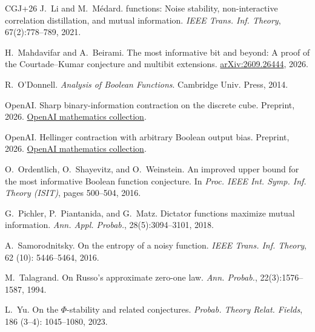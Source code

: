 \documentclass[11pt,letterpaper]{amsart}
\newcommand{\1}{\mathbf 1}
\numberwithin{equation}{section}
\begin{document}
\begin{thebibliography}{CGJ+26}
J.~Li and M.~M\'edard.
 functions: Noise stability, non-interactive correlation distillation, and mutual information.
\newblock \emph{IEEE Trans. Inf. Theory}, 67(2):778--789, 2021.

H.~Mahdavifar and A.~Beirami.
\newblock The most informative bit and beyond:
A proof of the {Courtade--Kumar} conjecture and multibit extensions.
\newblock \href{https://arxiv.org/abs/2609.26444}
{arXiv:2609.26444}, 2026.

R.~O'Donnell.
\newblock \emph{Analysis of {Boolean} Functions}.
\newblock Cambridge Univ. Press, 2014.

OpenAI.
\newblock Sharp binary-information contraction on the discrete cube.
\newblock Preprint, 2026.
\newblock \href{https://github.com/openai/math/blob/main/preprints/Sharp-binary-information-contraction-on-the-discrete-cube-September-24-2026/main.pdf}
{OpenAI mathematics collection}.

OpenAI.
\newblock Hellinger contraction with arbitrary {Boolean} output bias.
\newblock Preprint, 2026.
\newblock \href{https://github.com/openai/math/blob/main/preprints/Hellinger-contraction-with-arbitrary-Boolean-output-bias-September-24-2026/main.pdf}
{OpenAI mathematics collection}.

O.~Ordentlich, O.~Shayevitz, and O.~Weinstein.
\newblock An improved upper bound for the most informative {Boolean} function
conjecture.
\newblock In \emph{Proc. IEEE Int. Symp. Inf. Theory (ISIT)}, pages 500--504, 2016.

G.~Pichler, P.~Piantanida, and G.~Matz.
\newblock Dictator functions maximize mutual information.
\newblock \emph{Ann. Appl. Probab.}, 28(5):3094--3101, 2018.

A.~Samorodnitsky.
\newblock On the entropy of a noisy function.
\newblock \emph{IEEE Trans. Inf. Theory}, 62
(10): 5446--5464, 2016.

M.~Talagrand.
\newblock On {Russo}'s approximate zero-one law.
\newblock \emph{Ann. Probab.}, 22(3):1576--1587, 1994.

L.~Yu.
\newblock On the {$\Phi$}-stability and related conjectures.
\newblock \emph{Probab. Theory Relat. Fields}, 186
(3--4): 1045--1080, 2023.


\end{thebibliography}
\end{document}
